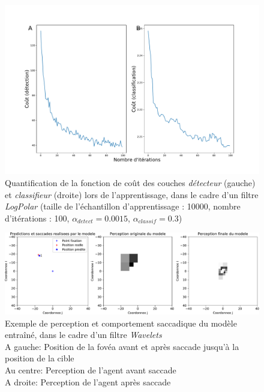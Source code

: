 \begin{figure}[th]
\centering
\includegraphics[scale=0.4]{Figures/logpolar_cost_learning}
\decoRule
\caption[Figure]{Quantification de la fonction de coût des couches \textit{détecteur} (gauche) et \textit{classifieur} (droite) lors de l'apprentissage, dans le cadre d'un filtre \textit{LogPolar} (taille de l'échantillon d'apprentissage :  10000, nombre d'itérations : 100, $\alpha_{detect}=0.0015$, $\alpha_{classif}=0.3$)}
\label{fig:logpolar_cost}
\end{figure}

\begin{figure}[th]
\centering
\includegraphics[scale=0.5]{Figures/saccades_wavelets}
\decoRule
\caption[Figure]{Exemple de perception et comportement saccadique du modèle entraîné, dans le cadre d'un filtre \textit{Wavelets}
\\ A gauche: Position de la fovéa avant et après saccade jusqu'à la position de la cible
\\ Au centre: Perception de l'agent avant saccade
\\ A droite: Perception de l'agent après saccade}
\label{fig:saccades_wavelets}
\end{figure}

